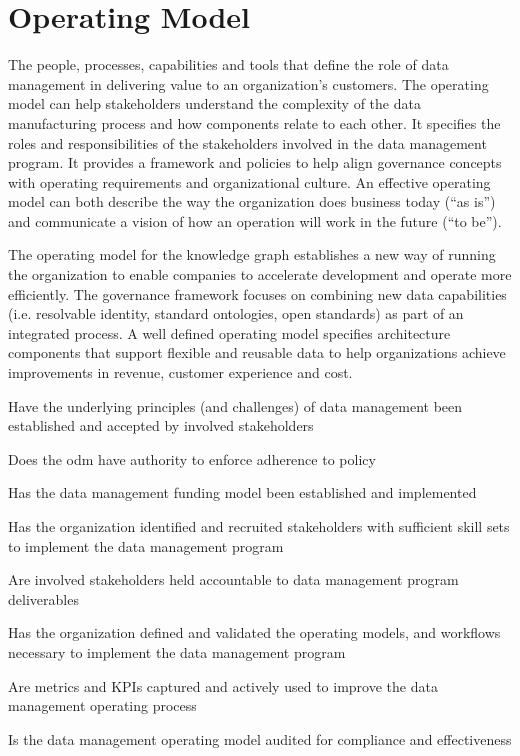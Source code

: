 \section{Operating Model}\label{sec:ekgmm-b-4-1} %

The people, processes, capabilities and tools that define the role of data management in delivering value to an
organization’s customers.
The operating model can help stakeholders understand the complexity of the data manufacturing process and how
components relate to each other.
It specifies the roles and responsibilities of the stakeholders involved in the data management program.
It provides a framework and policies to help align governance concepts with operating requirements and
organizational culture.
An effective operating model can both describe the way the organization does business today (“as is”) and
communicate a vision of how an operation will work in the future (“to be”).

\ekgmmContextSection

The operating model for the knowledge graph establishes a new way of running the organization to enable companies to
accelerate development and operate more efficiently.
The  governance framework focuses on combining new data capabilities (i.e. resolvable identity,
standard ontologies, open standards) as part of an integrated process.
A well defined operating model specifies architecture components that support flexible and reusable data to help
organizations achieve improvements in revenue, customer experience and cost.

\kgmmcorequestionssection

\begin{core-questions}

  \item [\thesection.1] Have the underlying principles (and challenges) of data management been established and
                        accepted by involved stakeholders
  \item [\thesection.2] Does the \gls{odm} have authority to enforce adherence to policy
  \item [\thesection.3] Has the data management funding model been established and implemented
  \item [\thesection.4] Has the organization identified and recruited stakeholders with sufficient skill sets to
                        implement the data management program
  \item [\thesection.5] Are involved stakeholders held accountable to data management program deliverables
  \item [\thesection.6] Has the organization defined and validated the operating models, and workflows necessary to
                        implement the data management program
  \item [\thesection.7] Are metrics and KPIs captured and actively used to improve the data management operating process
  \item [\thesection.8] Is the data management operating model audited for compliance and effectiveness

\end{core-questions}

